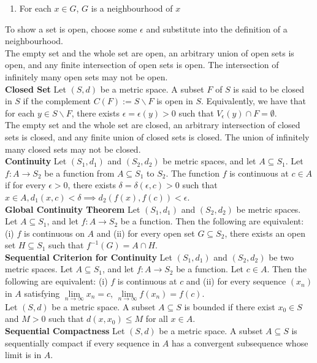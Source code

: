 \documentclass[10pt,landscape]{article}
\begin{document}
\begin{multicols}{3}
\begin{enumerate}
	\item For each  $x\in G$,  $G$ is a neighbourhood of  $x$
\end{enumerate}
To show a set is open, choose some $\epsilon$ and substitute into the definition of a neighbourhood.\\
The empty set and the whole set are open, an arbitrary union of open sets is open, and any finite intersection of open sets is open. The intersection of infinitely many open sets may not be open.\\
\textbf{Closed Set} Let $(S,d)$ be a metric space. A subset  $F$ of  $S$ is said to be closed in  $S$ if the complement  $C(F):=S\backslash F$ is open in  $S$. Equivalently, we have that for each $y\in S\backslash F$, there exists  $\epsilon=\epsilon(y)>0$ such that  $V_\epsilon(y)\cap F=\emptyset$.\\
The empty set and the whole set are closed, an arbitrary intersection of closed sets is closed, and any finite union of closed sets is closed. The union of infinitely many closed sets may not be closed.\\
\textbf{Continuity} Let $(S_1,d_1)$ and $(S_2,d_2)$ be metric spaces, and let $A\subseteq S_1$. Let $f:A\to S_2$ be a function from $A\subseteq S_1$ to $S_2$. The function $f$ is continuous at  $c\in A$ if for every  $\epsilon>0$, there exists  $\delta=\delta(\epsilon,c)>0$ such that  $x\in A, d_1(x,c)<\delta\implies d_2(f(x),f(c))<\epsilon$.\\
\textbf{Global Continuity Theorem} Let $(S_1,d_1)$ and $(S_2,d_2)$ be metric spaces. Let $A\subseteq S_1$, and let $f:A\to S_2$ be a function. Then the following are equivalent: (i) $f$ is continuous on $A$ and (ii) for every open set  $G\subseteq S_2$, there exists an open set $H\subseteq S_1$ such that $f^{-1}(G)=A\cap H$.\\
\textbf{Sequential Criterion for Continuity} Let  $(S_1,d_1)$ and $(S_2,d_2)$ be two metric spaces. Let $A\subseteq S_1$, and let $f:A\to S_2$ be a function. Let $c\in A$. Then the following are equivalent: (i)  $f$ is continuous at  $c$ and (ii) for every sequence  $(x_n)$ in  $A$ satisfying $\lim\limits_{n\to\infty}x_n=c$,  $\lim\limits_{n\to\infty}f(x_n)=f(c)$.\\
Let $(S,d)$ be a metric space. A subset  $A\subseteq S$ is bounded if there exist  $x_0\in S$ and  $M>0$ such that  $d(x,x_0)\leq M$ for all  $x\in A$.\\
\textbf{Sequential Compactness} Let  $(S,d)$ be a metric space. A subset  $A\subseteq S$ is sequentially compact if every sequence in  $A$ has  a convergent subsequence whose limit is in  $A$.\\

\end{multicols}
\end{document}
